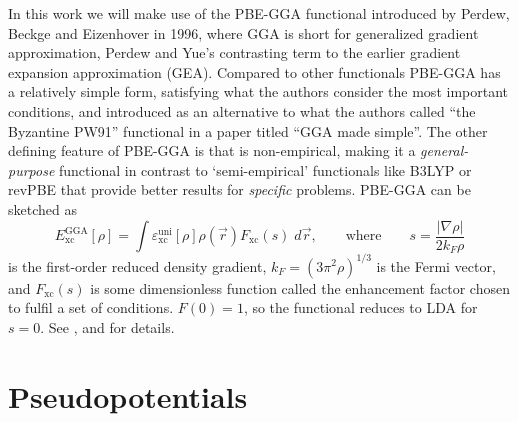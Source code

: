 \documentclass[11pt,bibliography=totoc,index=totoc]{scrbook}   %
\begin{document}
In this work we will make use of the PBE-GGA functional introduced by Perdew, Beckge and Eizenhover in 1996,\cite{PBE} where GGA is short for generalized gradient approximation, Perdew and Yue's contrasting term to the earlier gradient expansion approximation (GEA).\cite{Perdew:1986}
Compared to other functionals PBE-GGA has a relatively simple form, satisfying what the authors consider the most important conditions,
and introduced as an alternative to what the authors called ``the Byzantine PW91'' functional in a paper titled ``GGA made simple''.
The other defining feature of PBE-GGA is that is non-empirical, making it a \emph{general-purpose} functional in contrast to `semi-empirical' functionals like B3LYP or revPBE that provide better results for \emph{specific} problems.
PBE-GGA can be sketched as
\begin{equation}
    E_{\text{xc}}^{\text{GGA}}[\rho] = \int  \varepsilon_{\text{xc}}^{\text{uni}}[\rho] \rho(\vec{r}) F_{\text{xc}}(s) \;d\vec{r},
    \qquad\text{where}\qquad s= \frac{|\nabla\rho|}{2k_F\rho} 
  \label{eq:pbegga}
\end{equation}
is the first-order reduced density gradient, $k_F=(3\pi^2\rho)^{1/3}$ is the Fermi vector, and $F_{\text{xc}}(s)$ is some dimensionless function called the enhancement factor chosen to fulfil a set of conditions. $F(0)=1$, so the functional reduces to LDA for $s=0$. See \cite{Perdew:1986}, \cite{PBE} and \cite[154]{Martin:2004} for details.


%
\section{Pseudopotentials}\label{sec:pseudopot}
%
\end{document}

